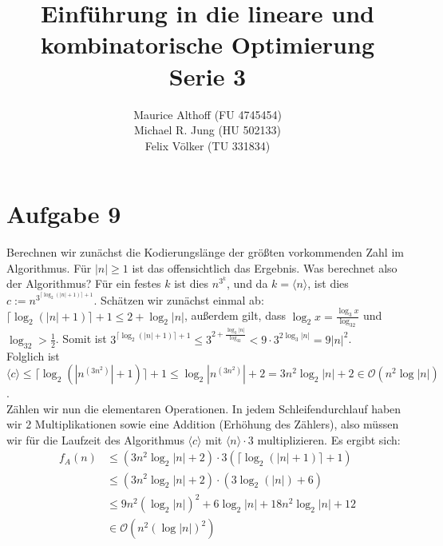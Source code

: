 \documentclass[a4paper,10pt,german]{scrartcl}
\title{Einführung in die lineare und kombinatorische Optimierung\\
Serie 3}
\author{Maurice Althoff (FU 4745454)\\Michael R. Jung (HU 502133)\\Felix Völker (TU 331834)}
\begin{document}
\maketitle

\section*{Aufgabe 9}
Berechnen wir zunächst die Kodierungslänge der größten vorkommenden Zahl im Algorithmus. Für 
$|n|\geq 1$ ist das offensichtlich das Ergebnis. Was berechnet also der Algorithmus? Für ein 
festes $k$ ist dies $n^{3^k}$, und da $k=\langle n\rangle$, ist dies 
$c:=n^{3^{\lceil\log_2(|n|+1)\rceil+1}}$. Schätzen wir zunächst einmal ab: $\lceil\log_2(|n|
+1)\rceil+1\leq 2+\log_2|n|$, außerdem gilt, dass ${\log_2x}=\frac{\log_3x}{\log_32}$ und 
$\log_32>\frac12$. Somit ist $3^{\lceil\log_2(|n|+1)\rceil+1}\leq 3^{2+\frac{\log_3|n|}
{\log_32}}<9\cdot3^{2\log_3|n|}=9|n|^2$. \\
Folglich ist $\langle c\rangle\leq\lceil \log_2(|n^{(3n^2)}|+1)\rceil+1\leq \log_2|n^{(3n^2)}|+2=3n^2\log_2|n|+2\in\mathcal{O}(n^2\log|n|)$.\\
Zählen wir nun die elementaren Operationen. In jedem Schleifendurchlauf haben wir 2 Multiplikationen sowie eine Addition (Erhöhung des Zählers), also müssen wir für die Laufzeit des Algorithmus $\langle c\rangle$ mit $\langle n\rangle \cdot 3$ multiplizieren.
Es ergibt sich:  
\begin{align*}
f_A(n)&\leq (3n^2\log_2|n|+2)\cdot 3(\lceil\log_2(|n|+1)\rceil+1)\\
&\leq(3n^2\log_2|n|+2)\cdot (3\log_2(|n|)+6)\\
&\leq 9n^2(\log_2{|n|})^2+6\log_2{|n|}+18n^2\log_2|n|+12\\
&\in \mathcal{O}(n^2(\log|n|)^2)
\end{align*}
\end{document}
